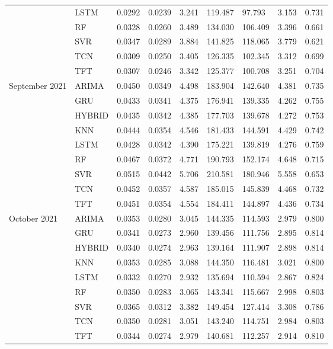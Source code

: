 \begin{tabular}{lllllllll}
 & LSTM & 0.0292 & 0.0239 & 3.241 & 119.487 & 97.793 & 3.153 & 0.731 \\
 & RF & 0.0328 & 0.0260 & 3.489 & 134.030 & 106.409 & 3.396 & 0.661 \\
 & SVR & 0.0347 & 0.0289 & 3.884 & 141.825 & 118.065 & 3.779 & 0.621 \\
 & TCN & 0.0309 & 0.0250 & 3.405 & 126.335 & 102.345 & 3.312 & 0.699 \\
 & TFT & 0.0307 & 0.0246 & 3.342 & 125.377 & 100.708 & 3.251 & 0.704 \\
September 2021 & ARIMA & 0.0450 & 0.0349 & 4.498 & 183.904 & 142.640 & 4.381 & 0.735 \\
 & GRU & 0.0433 & 0.0341 & 4.375 & 176.941 & 139.335 & 4.262 & 0.755 \\
 & HYBRID & 0.0435 & 0.0342 & 4.385 & 177.703 & 139.678 & 4.272 & 0.753 \\
 & KNN & 0.0444 & 0.0354 & 4.546 & 181.433 & 144.591 & 4.429 & 0.742 \\
 & LSTM & 0.0428 & 0.0342 & 4.390 & 175.221 & 139.819 & 4.276 & 0.759 \\
 & RF & 0.0467 & 0.0372 & 4.771 & 190.793 & 152.174 & 4.648 & 0.715 \\
 & SVR & 0.0515 & 0.0442 & 5.706 & 210.581 & 180.946 & 5.558 & 0.653 \\
 & TCN & 0.0452 & 0.0357 & 4.587 & 185.015 & 145.839 & 4.468 & 0.732 \\
 & TFT & 0.0451 & 0.0354 & 4.554 & 184.411 & 144.897 & 4.436 & 0.734 \\
October 2021 & ARIMA & 0.0353 & 0.0280 & 3.045 & 144.335 & 114.593 & 2.979 & 0.800 \\
 & GRU & 0.0341 & 0.0273 & 2.960 & 139.456 & 111.756 & 2.895 & 0.814 \\
 & HYBRID & 0.0340 & 0.0274 & 2.963 & 139.164 & 111.907 & 2.898 & 0.814 \\
 & KNN & 0.0353 & 0.0285 & 3.088 & 144.350 & 116.481 & 3.021 & 0.800 \\
 & LSTM & 0.0332 & 0.0270 & 2.932 & 135.694 & 110.594 & 2.867 & 0.824 \\
 & RF & 0.0350 & 0.0283 & 3.065 & 143.341 & 115.667 & 2.998 & 0.803 \\
 & SVR & 0.0365 & 0.0312 & 3.382 & 149.454 & 127.414 & 3.308 & 0.786 \\
 & TCN & 0.0350 & 0.0281 & 3.051 & 143.240 & 114.751 & 2.984 & 0.803 \\
 & TFT & 0.0344 & 0.0274 & 2.979 & 140.681 & 112.257 & 2.914 & 0.810 \\

\end{tabular}
